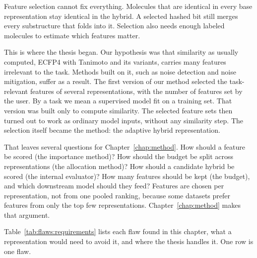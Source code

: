 Feature selection cannot fix everything. Molecules that are identical in every base representation stay identical in the hybrid. A selected hashed bit still merges every substructure that folds into it. Selection also needs enough labeled molecules to estimate which features matter.

This is where the thesis began. Our hypothesis was that similarity as usually computed, ECFP4 with Tanimoto and its variants, carries many features irrelevant to the task. Methods built on it, such as noise detection and noise mitigation, suffer as a result. The first version of our method selected the task-relevant features of several representations, with the number of features set by the user. By a task we mean a supervised model fit on a training set. That version was built only to compute similarity. The selected feature sets then turned out to work as ordinary model inputs, without any similarity step. The selection itself became the method: the adaptive hybrid representation.

That leaves several questions for Chapter~\ref{chap:method}. How should a feature be scored (the importance method)? How should the budget be split across representations (the allocation method)? How should a candidate hybrid be scored (the internal evaluator)? How many features should be kept (the budget), and which downstream model should they feed? Features are chosen per representation, not from one pooled ranking, because some datasets prefer features from only the top few representations. Chapter~\ref{chap:method} makes that argument.

Table~\ref{tab:flaws:requirements} lists each flaw found in this chapter, what a representation would need to avoid it, and where the thesis handles it. One row is one flaw.

